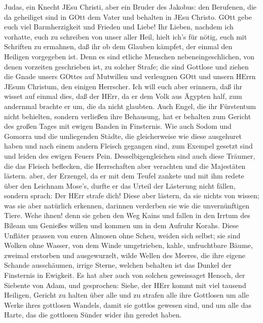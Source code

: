  Judas, ein Knecht JEsu Christi, aber ein Bruder des
Jakobus: den Berufenen, die da geheiliget sind in GOtt dem Vater und
behalten in JEsu Christo.  GOtt gebe euch viel
Barmherzigkeit und Frieden und Liebe!  Ihr Lieben, nachdem
ich vorhatte, euch zu schreiben von unser aller Heil, hielt ich's für
nötig, euch mit Schriften zu ermahnen, daß ihr ob dem Glauben kämpfet,
der einmal den Heiligen vorgegeben ist.  Denn es sind
etliche Menschen nebeneingeschlichen, von denen vorzeiten geschrieben
ist, zu solcher Strafe; die sind Gottlose und ziehen die Gnade unsers
GOttes auf Mutwillen und verleugnen GOtt und unsern HErrn JEsum
Christum, den einigen Herrscher.  Ich will euch aber
erinnern, daß ihr wisset auf einmal dies, daß der HErr, da er dem Volk
aus Ägypten half, zum andernmal brachte er um, die da nicht glaubten.
 Auch Engel, die ihr Fürstentum nicht behielten, sondern
verließen ihre Behausung, hat er behalten zum Gericht des großen Tages
mit ewigen Banden in Finsternis.  Wie auch Sodom und Gomorra
und die umliegenden Städte, die gleicherweise wie diese ausgehuret haben
und nach einem andern Fleisch gegangen sind, zum Exempel gesetzt sind
und leiden des ewigen Feuers Pein.  Desselbigengleichen sind
auch diese Träumer, die das Fleisch beflecken, die Herrschaften aber
verachten und die Majestäten lästern.  aber, der Erzengel,
da er mit dem Teufel zankete und mit ihm redete über den Leichnam
Mose's, durfte er das Urteil der Lästerung nicht fällen, sondern sprach:
Der HErr strafe dich!  Diese aber lästern, da sie nichts
von wissen; was sie aber natürlich erkennen, darinnen verderben sie wie
die unvernünftigen Tiere.  Wehe ihnen! denn sie gehen den
Weg Kains und fallen in den Irrtum des Bileam um Genießes willen und
kommen um in dem Aufruhr Korahs.  Diese Unfläter prassen
von euren Almosen ohne Scheu, weiden sich selbst; sie sind Wolken ohne
Wasser, von dem Winde umgetrieben, kahle, unfruchtbare Bäume, zweimal
erstorben und ausgewurzelt,  wilde Wellen des Meeres, die
ihre eigene Schande ausschäumen, irrige Sterne, welchen behalten ist das
Dunkel der Finsternis in Ewigkeit.  Es hat aber auch von
solchen geweissaget Henoch, der Siebente von Adam, und gesprochen:
Siehe, der HErr kommt mit viel tausend Heiligen,  Gericht
zu halten über alle und zu strafen alle ihre Gottlosen um alle Werke
ihres gottlosen Wandels, damit sie gottlos gewesen sind, und um alle das
Harte, das die gottlosen Sünder wider ihn geredet haben. 
